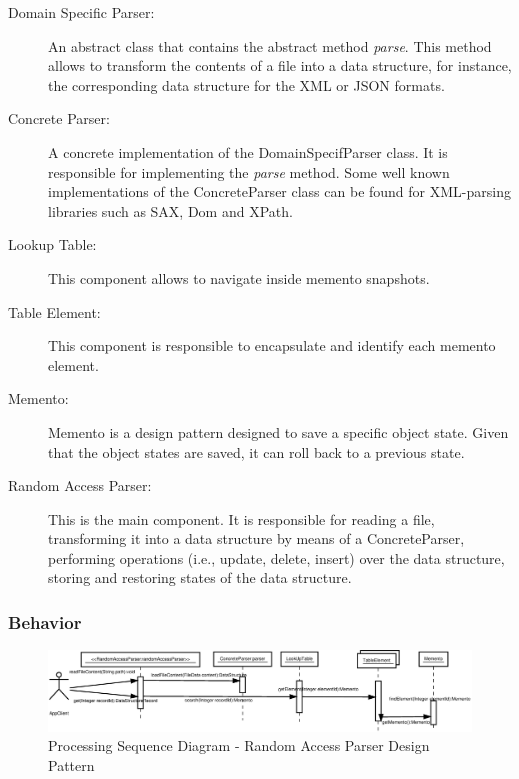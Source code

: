 \begin{description}
	\item[Domain Specific Parser:]
	An abstract class that contains the abstract method \textit{parse}. This method allows to transform the contents of a file into a data structure, for instance, the corresponding data structure for the XML or JSON formats.
	
	\item[Concrete Parser:]
	A concrete implementation of the DomainSpecifParser class. It is responsible for implementing the \textit{parse} method. Some well known implementations of the ConcreteParser class can be found for XML-parsing libraries such as SAX, Dom and XPath.
	
	\item[Lookup Table:]
	This component allows to navigate inside memento snapshots.
	
	\item[Table Element:]
	This component is responsible to encapsulate and identify each memento element.
	
	\item[Memento:]
	Memento is a design pattern designed to save a specific object state. Given that the object states are saved, it can roll back to a previous state.
	
	\item[Random Access Parser:]
	This is the main component. It is responsible for reading a file, transforming it into a data structure by means of a ConcreteParser, performing operations (i.e., update, delete, insert) over the data structure, storing and restoring states of the data structure.
	
\end{description}

\subsubsection{Behavior}


\begin{figure}
	\centering
	\includegraphics*[width=1\textwidth, keepaspectratio=false]{fig/image3.eps}
	\caption{Processing Sequence Diagram - Random Access Parser Design Pattern}
	\label{fig:proc_seq_diagram_rap}
\end{figure}

